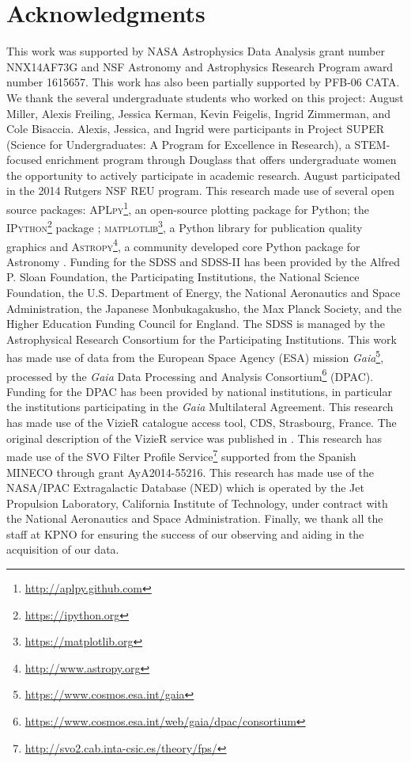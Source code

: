 \documentclass[apj, revtex4-1]{emulateapj}
\begin{document}
\section*{Acknowledgments}
This work was supported by NASA Astrophysics Data Analysis grant number NNX14AF73G and NSF Astronomy and Astrophysics Research Program award number 1615657. This work has also been partially supported by PFB-06 CATA. We thank the several undergraduate students who worked on this project: August Miller, Alexis Freiling, Jessica Kerman, Kevin Feigelis, Ingrid Zimmerman, and Cole Bisaccia. Alexis, Jessica, and Ingrid were participants in Project SUPER (Science for Undergraduates: A Program for Excellence in Research), a STEM-focused enrichment program through Douglass that offers undergraduate women the opportunity to actively participate in academic research. August participated in the 2014 Rutgers NSF REU program.
This research made use of several open source packages: \textsc{APLpy}\footnote{\url{http://aplpy.github.com}}, an open-source plotting package for Python; the \textsc{IPython}\footnote{\url{https://ipython.org}} package \citep{Perez2007}; \textsc{matplotlib}\footnote{\url{https://matplotlib.org}}, a Python library for publication quality graphics \citep{Hunter2007} and \textsc{Astropy}\footnote{\url{http://www.astropy.org}}, a community developed core Python package for Astronomy \citep{TheAstropyCollaboration2013}.
Funding for the SDSS and SDSS-II has been provided by the Alfred P. Sloan Foundation, the Participating Institutions, the National Science Foundation, the U.S. Department of Energy, the National Aeronautics and Space Administration, the Japanese Monbukagakusho, the Max Planck Society, and the Higher Education Funding Council for England. The SDSS is managed by the Astrophysical Research Consortium for the Participating Institutions.
This work has made use of data from the European Space Agency (ESA) mission \textit{Gaia}\footnote{\url{https://www.cosmos.esa.int/gaia}}, processed by the \textit{Gaia} Data Processing and Analysis Consortium\footnote{\url{https://www.cosmos.esa.int/web/gaia/dpac/consortium}} (DPAC). Funding for the DPAC has been provided by national institutions, in particular the institutions participating in the \textit{Gaia} Multilateral Agreement.
This research has made use of the VizieR catalogue access tool, CDS, Strasbourg, France. The original description of the VizieR service was published in \cite{Ochsenbein2000}.
This research has made use of the SVO Filter Profile Service\footnote{\url{http://svo2.cab.inta-csic.es/theory/fps/}} supported from the Spanish MINECO through grant AyA2014-55216.
This research has made use of the NASA/IPAC Extragalactic Database (NED) which is operated by the Jet Propulsion Laboratory, California Institute of Technology, under contract with the National Aeronautics and Space Administration.
Finally, we thank all the staff at KPNO for ensuring the success of our observing and aiding in the acquisition of our data.




\end{document}
